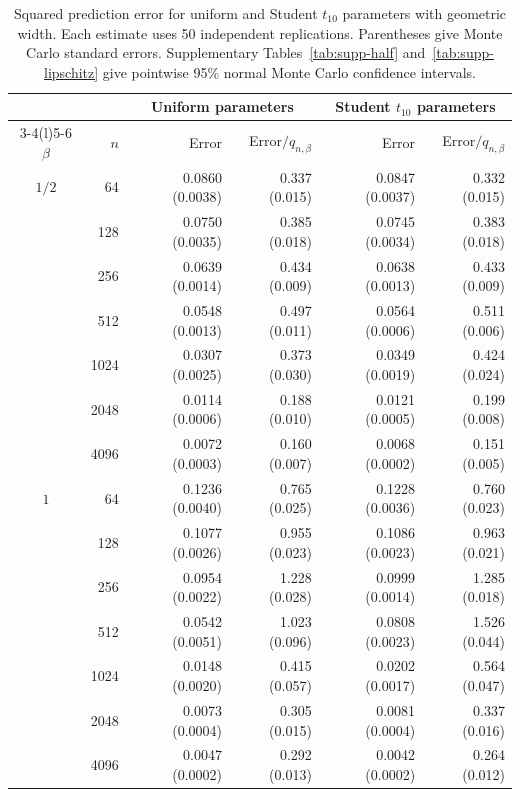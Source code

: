 \begin{table}[htbp]
\caption{Squared prediction error for uniform and Student $t_{10}$ parameters with geometric width. Each estimate uses 50 independent replications. Parentheses give Monte Carlo standard errors. Supplementary Tables~\ref{tab:supp-half} and~\ref{tab:supp-lipschitz} give pointwise 95\% normal Monte Carlo confidence intervals.}
\label{tab:direct-family-adaptive-risk}
\centering\small
\begin{tabular}{@{}crrrrr@{}}
\toprule
& & \multicolumn{2}{c}{Uniform parameters} & \multicolumn{2}{c}{Student $t_{10}$ parameters}\\
\cmidrule(lr){3-4}\cmidrule(l){5-6}
$\beta$ & $n$ & Error & Error$/q_{n,\beta}$ & Error & Error$/q_{n,\beta}$\\
\midrule
$1/2$ & 64 & 0.0860 (0.0038) & 0.337 (0.015) & 0.0847 (0.0037) & 0.332 (0.015)\\
 & 128 & 0.0750 (0.0035) & 0.385 (0.018) & 0.0745 (0.0034) & 0.383 (0.018)\\
 & 256 & 0.0639 (0.0014) & 0.434 (0.009) & 0.0638 (0.0013) & 0.433 (0.009)\\
 & 512 & 0.0548 (0.0013) & 0.497 (0.011) & 0.0564 (0.0006) & 0.511 (0.006)\\
 & 1024 & 0.0307 (0.0025) & 0.373 (0.030) & 0.0349 (0.0019) & 0.424 (0.024)\\
 & 2048 & 0.0114 (0.0006) & 0.188 (0.010) & 0.0121 (0.0005) & 0.199 (0.008)\\
 & 4096 & 0.0072 (0.0003) & 0.160 (0.007) & 0.0068 (0.0002) & 0.151 (0.005)\\
\midrule
$1$ & 64 & 0.1236 (0.0040) & 0.765 (0.025) & 0.1228 (0.0036) & 0.760 (0.023)\\
 & 128 & 0.1077 (0.0026) & 0.955 (0.023) & 0.1086 (0.0023) & 0.963 (0.021)\\
 & 256 & 0.0954 (0.0022) & 1.228 (0.028) & 0.0999 (0.0014) & 1.285 (0.018)\\
 & 512 & 0.0542 (0.0051) & 1.023 (0.096) & 0.0808 (0.0023) & 1.526 (0.044)\\
 & 1024 & 0.0148 (0.0020) & 0.415 (0.057) & 0.0202 (0.0017) & 0.564 (0.047)\\
 & 2048 & 0.0073 (0.0004) & 0.305 (0.015) & 0.0081 (0.0004) & 0.337 (0.016)\\
 & 4096 & 0.0047 (0.0002) & 0.292 (0.013) & 0.0042 (0.0002) & 0.264 (0.012)\\
\bottomrule
\end{tabular}
\end{table}
